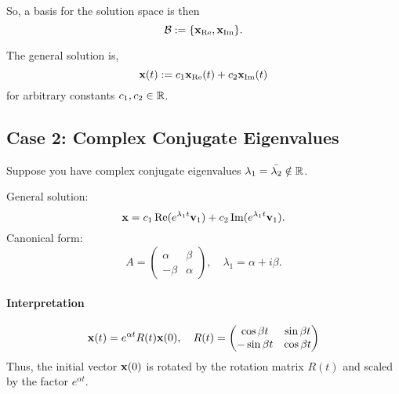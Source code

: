 So, a basis for the solution space is then
\[\mathcal{B}:= \{\mathbf{x}_{\Re}, \mathbf{x}_{\Im}\}.\]

The general solution is,
\[\mathbf{x}(t) := c_1 \mathbf{x}_{\Re}(t) + c_2 \mathbf{x}_{\Im}(t)\]
for arbitrary constants \(c_1, c_2 \in \mathbb{R}\).

\subsection{Case 2: Complex Conjugate Eigenvalues}
Suppose you have complex conjugate eigenvalues \(\lambda_1 = \bar{\lambda_2} \notin \mathbb{R}\).

General solution:
\[\mathbf{x} = c_1 \Re(e^{\lambda_1 t}\mathbf{v}_1) + c_2 \Im(e^{\lambda_1 t}\mathbf{v}_1).\]
Canonical form:
\[A = \begin{pmatrix}
        \alpha & \beta  \\
        -\beta & \alpha
    \end{pmatrix}, \quad \lambda_1 = \alpha + i\beta.
\]

\paragraph{Interpretation}
\[\mathbf{x}(t) = e^{\alpha t}R(t)\mathbf{x}(0), \quad R(t) = \begin{pmatrix}
        \cos \beta t  & \sin \beta t \\
        -\sin \beta t & \cos \beta t
    \end{pmatrix}
\]
Thus, the initial vector \(\mathbf{x}(0)\) is rotated by the rotation matrix \(R(t)\) and scaled by the factor \(e^{\alpha t}\).


